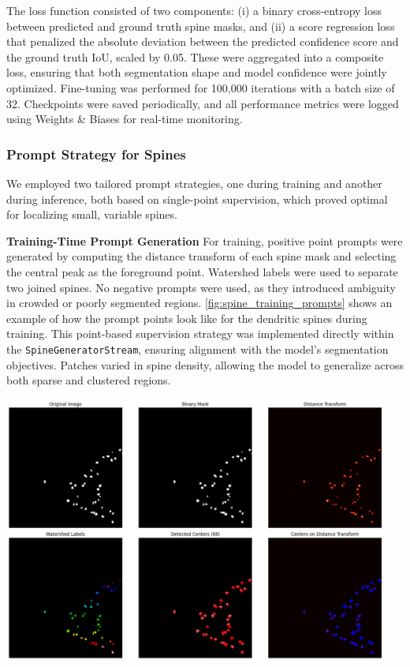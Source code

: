 The loss function consisted of two components: (i) a binary cross-entropy loss between predicted and ground truth spine masks, and (ii) a score regression loss that penalized the absolute deviation between the predicted confidence score and the ground truth \gls{IoU}, scaled by 0.05. These were aggregated into a composite loss, ensuring that both segmentation shape and model confidence were jointly optimized.
Fine-tuning was performed for 100,000 iterations with a batch size of 32. Checkpoints were saved periodically, and all performance metrics were logged using Weights \& Biases for real-time monitoring.

\subsubsection{\textbf{Prompt Strategy for Spines}}
We employed two tailored prompt strategies, one during training and another during inference, both based on single-point supervision, which proved optimal for localizing small, variable spines.

\textbf{Training-Time Prompt Generation }
For training, positive point prompts were generated by computing the distance transform of each spine mask and selecting the central peak as the foreground point. Watershed labels were used to separate two joined spines. No negative prompts were used, as they introduced ambiguity in crowded or poorly segmented regions. \autoref{fig:spine_training_prompts} shows an example of how the prompt points look like for the dendritic spines during training. This point-based supervision strategy was implemented directly within the \texttt{SpineGeneratorStream}, ensuring alignment with the model’s segmentation objectives. Patches varied in spine density, allowing the model to generalize across both sparse and clustered regions.

\begin{center}
\includegraphics[width=0.95\textwidth]{figures/18_spine_prompt_training.png}
\label{fig:spine_training_prompts}
\end{center}

